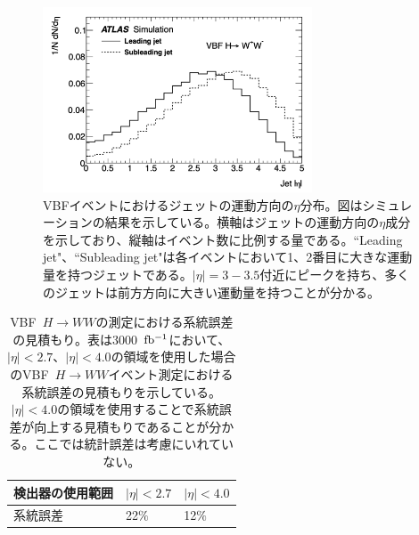\begin{figure}[bpt]\centering
\includegraphics[width=8cm]{./VBF_jet_eta.png}
\caption[VBFイベントにおけるジェットの運動方向の$\eta$分布]{VBFイベントにおけるジェットの運動方向の$\eta$分布\cite{1-3}。図はシミュレーションの結果を示している。横軸はジェットの運動方向の$\eta$成分を示しており、縦軸はイベント数に比例する量である。``Leading jet"、``Subleading jet"は各イベントにおいて1、2番目に大きな運動量を持つジェットである。$|\eta|=3-3.5$付近にピークを持ち、多くのジェットは前方方向に大きい運動量を持つことが分かる。}
\label{VBF_jet_eta}
\end{figure}

\begin{table}[bpt]
\begin{center}
\caption[VBF~$H\rightarrow WW$の測定における系統誤差の見積もり]{VBF~$H\rightarrow WW$の測定における系統誤差の見積もり\cite{1-3}。表は3000~$\rm{fb^{-1}}$において、$|\eta| <2.7$、$|\eta| <4.0$の領域を使用した場合のVBF~$H\rightarrow WW$イベント測定における系統誤差の見積もりを示している。$|\eta| <4.0$の領域を使用することで系統誤差が向上する見積もりであることが分かる。ここでは統計誤差は考慮にいれていない。}
\label{VBF_uncertainty}
  \begin{tabular}{|lll|} \hline
    検出器の使用範囲 & $|\eta| <2.7 $ & $|\eta| < 4.0 $ \\ \hline
    系統誤差 & 22$\%$ & 12$\%$ \\ \hline
  \end{tabular}
\end{center}
\end{table}

